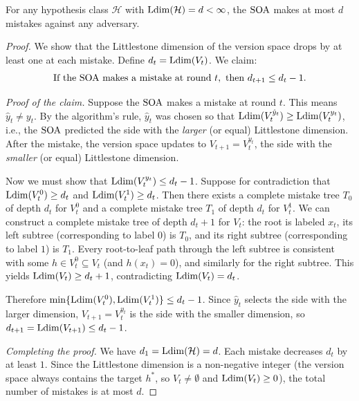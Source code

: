 \begin{thm}
\label{thm:soa-upper}
  \leanok
For any hypothesis class $\mathcal{H}$ with $\mathrm{Ldim}(\mathcal{H}) = d < \infty$, the $\operatorname{SOA}$ makes at most $d$ mistakes against any adversary.
\end{thm}

\begin{proof}
We show that the Littlestone dimension of the version space drops by at least one at each mistake. Define $d_t = \mathrm{Ldim}(V_t)$. We claim:
\begin{equation}
\label{eq:ldim-drop}
\text{If the $\operatorname{SOA}$ makes a mistake at round } t, \text{ then } d_{t+1} \leq d_t - 1.
\end{equation}

\emph{Proof of the claim.} Suppose the $\operatorname{SOA}$ makes a mistake at round $t$. This means $\hat{y}_t \neq y_t$. By the algorithm's rule, $\hat{y}_t$ was chosen so that $\mathrm{Ldim}(V_t^{\hat{y}_t}) \geq \mathrm{Ldim}(V_t^{y_t})$, i.e., the $\operatorname{SOA}$ predicted the side with the \emph{larger} (or equal) Littlestone dimension. After the mistake, the version space updates to $V_{t+1} = V_t^{y_t}$, the side with the \emph{smaller} (or equal) Littlestone dimension.

Now we must show that $\mathrm{Ldim}(V_t^{y_t}) \leq d_t - 1$. Suppose for contradiction that $\mathrm{Ldim}(V_t^0) \geq d_t$ and $\mathrm{Ldim}(V_t^1) \geq d_t$. Then there exists a complete mistake tree $T_0$ of depth $d_t$ for $V_t^0$ and a complete mistake tree $T_1$ of depth $d_t$ for $V_t^1$. We can construct a complete mistake tree of depth $d_t + 1$ for $V_t$: the root is labeled $x_t$, its left subtree (corresponding to label $0$) is $T_0$, and its right subtree (corresponding to label $1$) is $T_1$. Every root-to-leaf path through the left subtree is consistent with some $h \in V_t^0 \subseteq V_t$ (and $h(x_t) = 0$), and similarly for the right subtree. This yields $\mathrm{Ldim}(V_t) \geq d_t + 1$, contradicting $\mathrm{Ldim}(V_t) = d_t$.

Therefore $\min\{\mathrm{Ldim}(V_t^0), \mathrm{Ldim}(V_t^1)\} \leq d_t - 1$. Since $\hat{y}_t$ selects the side with the larger dimension, $V_{t+1} = V_t^{y_t}$ is the side with the smaller dimension, so $d_{t+1} = \mathrm{Ldim}(V_{t+1}) \leq d_t - 1$.

\emph{Completing the proof.} We have $d_1 = \mathrm{Ldim}(\mathcal{H}) = d$. Each mistake decreases $d_t$ by at least $1$. Since the Littlestone dimension is a non-negative integer (the version space always contains the target $h^*$, so $V_t \neq \emptyset$ and $\mathrm{Ldim}(V_t) \geq 0$), the total number of mistakes is at most $d$.
\end{proof}

